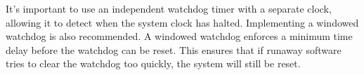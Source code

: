 It's important to use an independent watchdog timer with a separate clock, allowing it to detect when the system clock has halted.
 Implementing a windowed watchdog is also recommended. 
A windowed watchdog enforces a minimum time delay before the watchdog can be reset. 
This ensures that if runaway software tries to clear the watchdog too quickly, the system will still be reset.